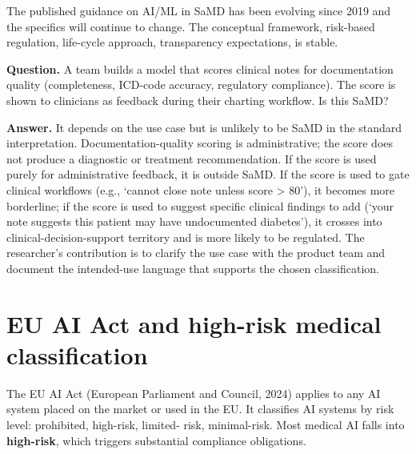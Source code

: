 \documentclass[
  letterpaper,
  11pt]{scrbook}
\begin{document}
The published guidance on AI/ML in SaMD has been evolving since 2019 and
the specifics will continue to change. The conceptual framework,
risk-based regulation, life-cycle approach, transparency expectations,
is stable.

\begin{tcolorbox}[enhanced jigsaw, arc=.35mm, bottomrule=.15mm, bottomtitle=1mm, breakable, colback=white, colbacktitle=quarto-callout-note-color!10!white, colframe=quarto-callout-note-color-frame, coltitle=black, left=2mm, leftrule=.75mm, opacityback=0, opacitybacktitle=0.6, rightrule=.15mm, title={Check your understanding: SaMD or not?}, titlerule=0mm, toprule=.15mm, toptitle=1mm]

\textbf{Question.} A team builds a model that scores clinical notes for
documentation quality (completeness, ICD-code accuracy, regulatory
compliance). The score is shown to clinicians as feedback during their
charting workflow. Is this SaMD?

\textbf{Answer.} It depends on the use case but is unlikely to be SaMD
in the standard interpretation. Documentation-quality scoring is
administrative; the score does not produce a diagnostic or treatment
recommendation. If the score is used purely for administrative feedback,
it is outside SaMD. If the score is used to gate clinical workflows
(e.g., `cannot close note unless score \textgreater{} 80'), it becomes
more borderline; if the score is used to suggest specific clinical
findings to add (`your note suggests this patient may have undocumented
diabetes'), it crosses into clinical-decision-support territory and is
more likely to be regulated. The researcher's contribution is to clarify
the use case with the product team and document the intended-use
language that supports the chosen classification.

\end{tcolorbox}

\section{EU AI Act and high-risk medical
classification}\label{eu-ai-act-and-high-risk-medical-classification}

The EU AI Act (European Parliament and Council, 2024) applies to any AI
system placed on the market or used in the EU. It classifies AI systems
by risk level: prohibited, high-risk, limited- risk, minimal-risk. Most
medical AI falls into \textbf{high-risk}, which triggers substantial
compliance obligations.
\end{document}
